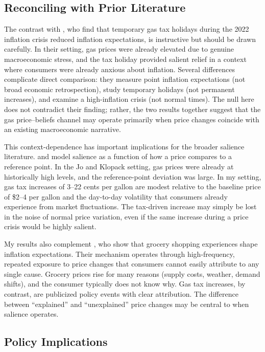 \documentclass[12pt]{article}
\begin{document}
\subsection{Reconciling with Prior Literature}

The contrast with \citet{jo2025fueling}, who find that temporary gas tax holidays during the 2022 inflation crisis reduced inflation expectations, is instructive but should be drawn carefully. In their setting, gas prices were already elevated due to genuine macroeconomic stress, and the tax holiday provided salient relief in a context where consumers were already anxious about inflation. Several differences complicate direct comparison: they measure point inflation expectations (not broad economic retrospection), study temporary holidays (not permanent increases), and examine a high-inflation crisis (not normal times). The null here does not contradict their finding; rather, the two results together suggest that the gas price--beliefs channel may operate primarily when price changes coincide with an existing macroeconomic narrative.

This context-dependence has important implications for the broader salience literature. \citet{bordalo2013salience} and \citet{gabaix2014sparsity} model salience as a function of how a price compares to a reference point. In the Jo and Klopack setting, gas prices were already at historically high levels, and the reference-point deviation was large. In my setting, gas tax increases of 3--22 cents per gallon are modest relative to the baseline price of \$2--4 per gallon and the day-to-day volatility that consumers already experience from market fluctuations. The tax-driven increase may simply be lost in the noise of normal price variation, even if the same increase during a price crisis would be highly salient.

My results also complement \citet{dacunto2021exposure}, who show that grocery shopping experiences shape inflation expectations. Their mechanism operates through high-frequency, repeated exposure to price changes that consumers cannot easily attribute to any single cause. Grocery prices rise for many reasons (supply costs, weather, demand shifts), and the consumer typically does not know why. Gas tax increases, by contrast, are publicized policy events with clear attribution. The difference between ``explained'' and ``unexplained'' price changes may be central to when salience operates.

\subsection{Policy Implications}
\end{document}
